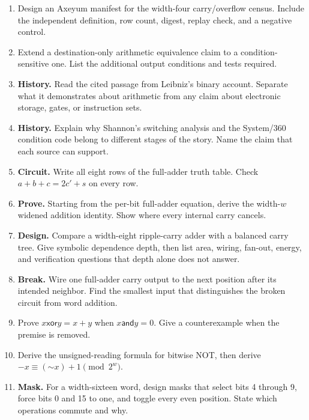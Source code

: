\begin{enumerate}
\item Design an Axeyum manifest for the width-four carry/overflow census.
Include the independent definition, row count, digest, replay check, and a
negative control.

\item Extend a destination-only arithmetic equivalence claim to a condition-
sensitive one. List the additional output conditions and tests required.

\item \textbf{History.} Read the cited passage from Leibniz's binary account.
Separate what it demonstrates about arithmetic from any claim about electronic
storage, gates, or instruction sets.

\item \textbf{History.} Explain why Shannon's switching analysis and the
System/360 condition code belong to different stages of the story. Name the
claim that each source can support.

\item \textbf{Circuit.} Write all eight rows of the full-adder truth table.
Check \(a+b+c=2c'+s\) on every row.

\item \textbf{Prove.} Starting from the per-bit full-adder equation, derive the
width-\(w\) widened addition identity. Show where every internal carry
cancels.

\item \textbf{Design.} Compare a width-eight ripple-carry adder with a balanced
carry tree. Give symbolic dependence depth, then list area, wiring, fan-out,
energy, and verification questions that depth alone does not answer.

\item \textbf{Break.} Wire one full-adder carry output to the next position
after its intended neighbor. Find the smallest input that distinguishes the
broken circuit from word addition.

\item Prove \(x\mathbin{\mathsf{xor}}y=x+y\) when
\(x\mathbin{\mathsf{and}}y=0\). Give a counterexample when the premise is
removed.

\item Derive the unsigned-reading formula for bitwise NOT, then derive
\(-x\equiv(\mathord{\sim}x)+1\pmod{2^w}\).

\item \textbf{Mask.} For a width-sixteen word, design masks that select bits
4 through 9, force bits 0 and 15 to one, and toggle every even position. State
which operations commute and why.


\end{enumerate}
